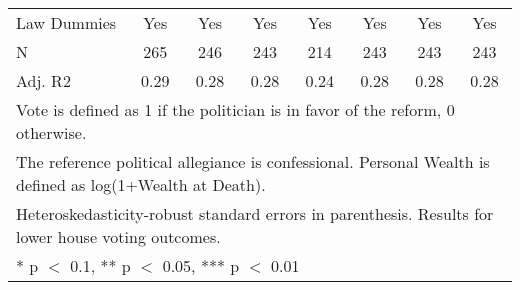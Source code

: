 \begin{table}
\begin{tabular}[t]{lccccccc}
\midrule
Law Dummies & Yes & Yes & Yes & Yes & Yes & Yes & Yes\\
N & \num{265} & \num{246} & \num{243} & \num{214} & \num{243} & \num{243} & \num{243}\\
Adj. R2 & \num{0.29} & \num{0.28} & \num{0.28} & \num{0.24} & \num{0.28} & \num{0.28} & \num{0.28}\\
\bottomrule
\multicolumn{8}{l}{\rule{0pt}{1em}Vote is defined as 1 if the politician is in favor of the reform, 0 otherwise.}\\
\multicolumn{8}{l}{\rule{0pt}{1em}The reference political allegiance is confessional. Personal Wealth is defined as log(1+Wealth at Death).}\\
\multicolumn{8}{l}{\rule{0pt}{1em}Heteroskedasticity-robust standard errors in parenthesis. Results for lower house voting outcomes.}\\
\multicolumn{8}{l}{\rule{0pt}{1em}* p $<$ 0.1, ** p $<$ 0.05, *** p $<$ 0.01}\\
\end{tabular}
\end{table}
